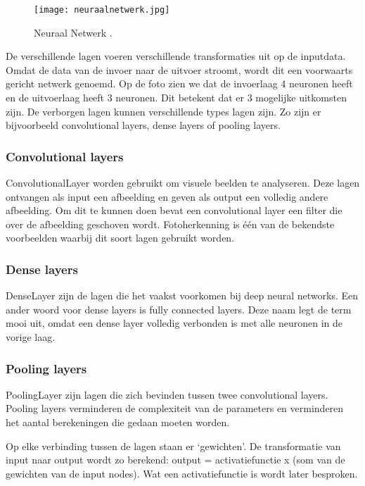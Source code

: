 \begin{figure}[!ht]
    \texttt{[image: neuraalnetwerk.jpg]}
    \caption{\label{neuraalnetwerk}Neuraal Netwerk \autocite{KULeuven2019}.}
\end{figure}

De verschillende lagen voeren verschillende transformaties uit op de inputdata. Omdat de data van de invoer naar de uitvoer stroomt, wordt dit een voorwaarts gericht netwerk genoemd. Op de foto zien we dat de invoerlaag 4 neuronen heeft en de uitvoerlaag heeft 3 neuronen. Dit betekent dat er 3 mogelijke uitkomsten zijn. De verborgen lagen kunnen verschillende types lagen zijn. Zo zijn er bijvoorbeeld convolutional layers, dense layers of pooling layers. 

\subsubsection{Convolutional layers}
\label{sec:convolutionallayers}
\gls{ConvolutionalLayer} worden gebruikt om visuele beelden te analyseren. Deze lagen ontvangen als input een afbeelding en geven als output een volledig andere afbeelding. Om dit te kunnen doen bevat een convolutional layer een filter die over de afbeelding geschoven wordt. Fotoherkenning is één van de bekendste voorbeelden waarbij dit soort lagen gebruikt worden. \autocite{Nanculef2020}


\subsubsection{Dense layers}
\label{sec:denselayers}
\gls{DenseLayer} zijn de lagen die het vaakst voorkomen bij deep neural networks. Een ander woord voor dense layers is fully connected layers. Deze naam legt de term mooi uit, omdat een dense layer volledig verbonden is met alle neuronen in de vorige laag. \autocite{Balachandran2020}


\subsubsection{Pooling layers}
\label{sec:poolinglayers}
\gls{PoolingLayer} zijn lagen die zich bevinden tussen twee convolutional layers. Pooling layers verminderen de complexiteit van de parameters en verminderen het aantal berekeningen die gedaan moeten worden. \autocite{Nanculef2020}

Op elke verbinding tussen de lagen staan er ‘gewichten’. De transformatie van input naar output wordt zo berekend:
output = activatiefunctie x (som van de gewichten van de input nodes). \autocite{Vervoort2017} Wat een activatiefunctie is wordt later besproken. 

